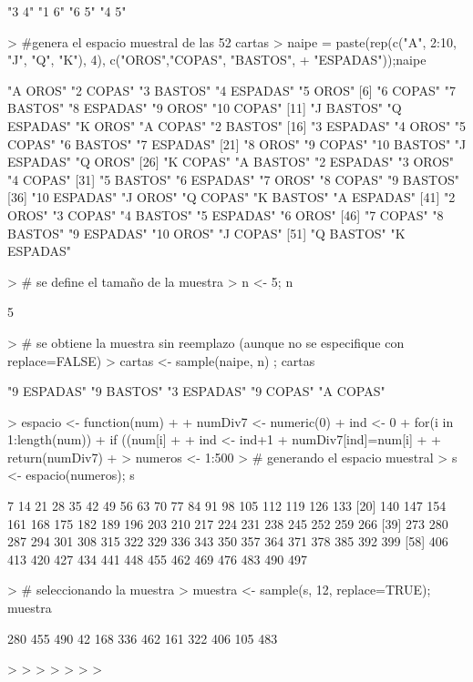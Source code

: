 \documentclass{article}
\begin{document}
\begin{Schunk}
\begin{Soutput}
[1] "3 4" "1 6" "6 5" "4 5"
\end{Soutput}
\begin{Sinput}
> #genera el espacio muestral de las 52 cartas
> naipe = paste(rep(c("A", 2:10, "J", "Q", "K"), 4), c("OROS","COPAS", "BASTOS",
+ "ESPADAS"));naipe
\end{Sinput}
\begin{Soutput}
 [1] "A OROS"     "2 COPAS"    "3 BASTOS"   "4 ESPADAS"  "5 OROS"    
 [6] "6 COPAS"    "7 BASTOS"   "8 ESPADAS"  "9 OROS"     "10 COPAS"  
[11] "J BASTOS"   "Q ESPADAS"  "K OROS"     "A COPAS"    "2 BASTOS"  
[16] "3 ESPADAS"  "4 OROS"     "5 COPAS"    "6 BASTOS"   "7 ESPADAS" 
[21] "8 OROS"     "9 COPAS"    "10 BASTOS"  "J ESPADAS"  "Q OROS"    
[26] "K COPAS"    "A BASTOS"   "2 ESPADAS"  "3 OROS"     "4 COPAS"   
[31] "5 BASTOS"   "6 ESPADAS"  "7 OROS"     "8 COPAS"    "9 BASTOS"  
[36] "10 ESPADAS" "J OROS"     "Q COPAS"    "K BASTOS"   "A ESPADAS" 
[41] "2 OROS"     "3 COPAS"    "4 BASTOS"   "5 ESPADAS"  "6 OROS"    
[46] "7 COPAS"    "8 BASTOS"   "9 ESPADAS"  "10 OROS"    "J COPAS"   
[51] "Q BASTOS"   "K ESPADAS" 
\end{Soutput}
\begin{Sinput}
> # se define el tamaño de la muestra
> n <- 5; n
\end{Sinput}
\begin{Soutput}
[1] 5
\end{Soutput}
\begin{Sinput}
> # se obtiene la muestra sin reemplazo (aunque no se especifique con replace=FALSE)
> cartas <- sample(naipe, n) ; cartas
\end{Sinput}
\begin{Soutput}
[1] "9 ESPADAS" "9 BASTOS"  "3 ESPADAS" "9 COPAS"   "A COPAS"  
\end{Soutput}
\begin{Sinput}
> espacio <- function(num)
+ {
+ numDiv7 <- numeric(0)
+ ind <- 0
+ for(i in 1:length(num))
+ if ((num[i] %
+ {
+ ind <- ind+1
+ numDiv7[ind]=num[i]
+ }
+ return(numDiv7)
+ }
> numeros <- 1:500
> # generando el espacio muestral
> s <- espacio(numeros); s
\end{Sinput}
\begin{Soutput}
 [1]   7  14  21  28  35  42  49  56  63  70  77  84  91  98 105 112 119 126 133
[20] 140 147 154 161 168 175 182 189 196 203 210 217 224 231 238 245 252 259 266
[39] 273 280 287 294 301 308 315 322 329 336 343 350 357 364 371 378 385 392 399
[58] 406 413 420 427 434 441 448 455 462 469 476 483 490 497
\end{Soutput}
\begin{Sinput}
> # seleccionando la muestra
> muestra <- sample(s, 12, replace=TRUE); muestra
\end{Sinput}
\begin{Soutput}
 [1] 280 455 490  42 168 336 462 161 322 406 105 483
\end{Soutput}
\begin{Sinput}
> 
> 
> 
> 
> 
> 
> 
\end{Sinput}
\end{Schunk}
\end{document}
